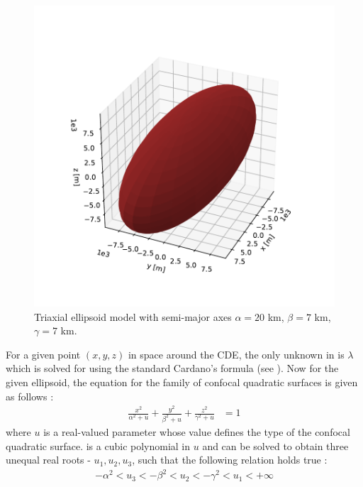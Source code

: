 \begin{figure}[htb]
\centering
\captionsetup{justification=centering}
\includegraphics[width=\textwidth, height=0.27\textheight, keepaspectratio=true]{cde.pdf}
\caption{Triaxial ellipsoid model with semi-major axes $\alpha=20$ km, $\beta=7$ km, $\gamma=7$ km.}
\label{fig:cde}
\end{figure}
\FloatBarrier
For a given point $(x, y, z)$ in space around the \gls{CDE}, the only unknown in  is $\lambda$ which is solved for using the standard Cardano's formula (see \cite{cubic_formula}). Now for the given ellipsoid, the equation for the family of confocal quadratic surfaces is given as follows \parencite{ellipsoid_potential_model}:
\begin{align}
    \frac{x^2}{\alpha^2 + u} + \frac{y^2}{\beta^2 + u} + \frac{z^2}{\gamma^2 + u} &= 1
    \label{eqn:confocal_quadrics}
\end{align}
where $u$ is a real-valued parameter whose value defines the type of the confocal quadratic surface.  is a cubic polynomial in $u$ and can be solved to obtain three unequal real roots - $u_1, u_2, u_3$, such that the following relation holds true \parencite{ellipsoid_potential_model}:
\begin{align}
    -\alpha^2 < u_3 < -\beta^2 < u_2 < -\gamma^2 < u_1 < +\infty
    \label{eqn:confocal_quadrics_all_real_roots}
\end{align}
